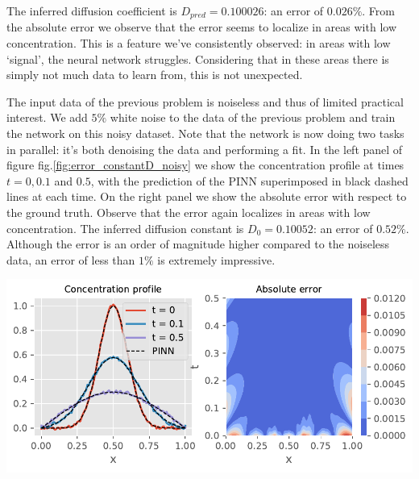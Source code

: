 \documentclass{Dissertate}
\let\origfigure\figure
\let\endorigfigure\endfigure
\renewenvironment{figure}[1][2] {
    \expandafter\origfigure\expandafter[H]
} {
    \endorigfigure
}
\begin{document}
The inferred diffusion coefficient is \(D_{pred} = 0.100026\): an error
of \(0.026\%\). From the absolute error we observe that the error seems
to localize in areas with low concentration. This is a feature we've
consistently observed: in areas with low `signal', the neural network
struggles. Considering that in these areas there is simply not much data
to learn from, this is not unexpected.

The input data of the previous problem is noiseless and thus of limited
practical interest. We add \(5\%\) white noise to the data of the
previous problem and train the network on this noisy dataset. Note that
the network is now doing two tasks in parallel: it's both denoising the
data and performing a fit. In the left panel of figure
fig.\ref{fig:error_constantD_noisy} we show the concentration profile
at times \(t = 0, 0.1\) and \(0.5\), with the prediction of the PINN
superimposed in black dashed lines at each time. On the right panel we
show the absolute error with respect to the ground truth. Observe that
the error again localizes in areas with low concentration. The inferred
diffusion constant is \(D_0 = 0.10052\): an error of \(0.52\%\).
Although the error is an order of magnitude higher compared to the
noiseless data, an error of less than \(1\%\) is extremely impressive.

\begin{figure}
\hypertarget{fig:error_constantD_noisy}{%
\centering
\includegraphics{source/figures/pdf/error_constantD_noisy.pdf}
\caption{\textbf{Left panel}: The original noisy concentration profile
at several times with the neural network inferred denoised version
superimposed. \textbf{Right panel}: The absolute error of neural network
with respect to the ground truth. Note that most of the error is located
at areas with low concentration.}\label{fig:error_constantD_noisy}
}
\end{figure}
\end{document}
